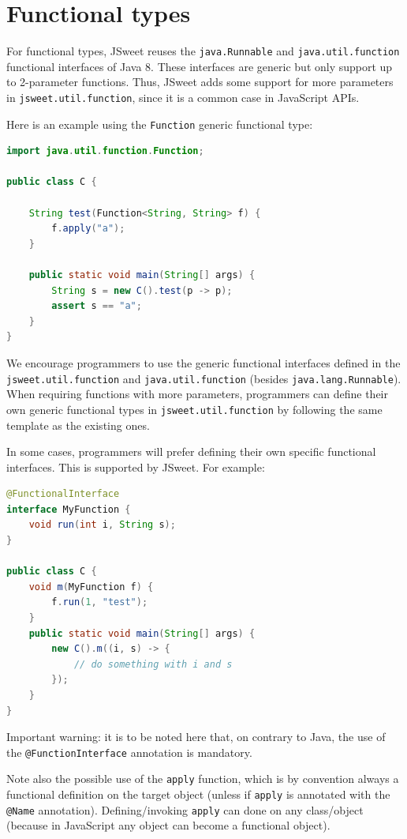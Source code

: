 \documentclass[a4paper]{report}
\begin{document}
\section{Functional types}

For functional types, JSweet reuses the \texttt{java.\-Runnable} and \texttt{java.\-util.\-function} functional interfaces of Java 8. These interfaces are generic but only support up to 2-parameter functions. Thus, JSweet adds some support for more parameters in \texttt{jsweet.\-util.\-function}, since it is a common case in JavaScript APIs.

Here is an example using the \texttt{Function} generic functional type:

\begin{lstlisting}[language=Java]
import java.util.function.Function;

public class C {

	String test(Function<String, String> f) {
		f.apply("a");
	}

	public static void main(String[] args) {
		String s = new C().test(p -> p);
		assert s == "a";
	}
}
\end{lstlisting}

We encourage programmers to use the generic functional interfaces defined in the \texttt{jsweet.\-util.\-function} and \texttt{java.\-util.\-function} (besides \texttt{java.\-lang.\-Runnable}). When requiring functions with more parameters, programmers can define their own generic functional types in \texttt{jsweet.\-util.\-function} by following the same template as the existing ones.

In some cases, programmers will prefer defining their own specific functional interfaces. This is supported by JSweet. For example:

\begin{lstlisting}[language=Java]
@FunctionalInterface
interface MyFunction {
	void run(int i, String s);
}

public class C {
	void m(MyFunction f) {
		f.run(1, "test");
	}
	public static void main(String[] args) {
		new C().m((i, s) -> {
			// do something with i and s
		});
	}
}
\end{lstlisting}

Important warning: it is to be noted here that, on contrary to Java, the use of the \texttt{@FunctionInterface} annotation is mandatory. 

Note also the possible use of the \texttt{apply} function, which is by convention always a functional definition on the target object (unless if \texttt{apply} is annotated with the \texttt{@Name} annotation). Defining/invoking \texttt{apply} can done on any class/object (because in JavaScript any object can become a functional object).
\end{document}
